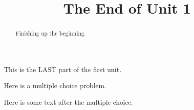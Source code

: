 \documentclass{ximera}
\title{The End of Unit 1}
\begin{document}
\begin{abstract}
  Finishing up the beginning.
\end{abstract}

This is the LAST part of the first unit.

\begin{exercise}
  Here is a multiple choice problem.
  \begin{solution}
    \begin{multiple-choice}
    \end{multiple-choice}
  \end{solution}

  Here is some text after the multiple choice.
\end{exercise}
\end{document}

